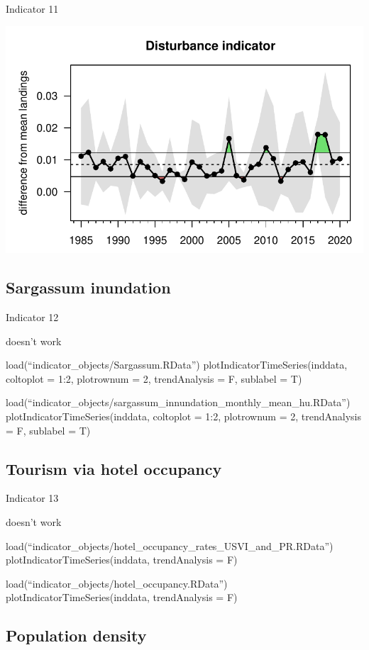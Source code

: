 \documentclass[
  letterpaper,
  oneside,
  open=any]{scrbook}
\begin{document}
Indicator 11

\includegraphics{Report_book_files/Risk_indicators_files/figure-pdf/unnamed-chunk-7-1.pdf}

\hypertarget{sargassum-inundation}{%
\subsection{Sargassum inundation}\label{sargassum-inundation}}

Indicator 12

doesn't work

load(``indicator\_objects/Sargassum.RData'')
plotIndicatorTimeSeries(inddata, coltoplot = 1:2, plotrownum = 2,
trendAnalysis = F, sublabel = T)

load(``indicator\_objects/sargassum\_innundation\_monthly\_mean\_hu.RData'')
plotIndicatorTimeSeries(inddata, coltoplot = 1:2, plotrownum = 2,
trendAnalysis = F, sublabel = T)

\hypertarget{tourism-via-hotel-occupancy}{%
\subsection{Tourism via hotel
occupancy}\label{tourism-via-hotel-occupancy}}

Indicator 13

doesn't work

load(``indicator\_objects/hotel\_occupancy\_rates\_USVI\_and\_PR.RData'')
plotIndicatorTimeSeries(inddata, trendAnalysis = F)

load(``indicator\_objects/hotel\_occupancy.RData'')
plotIndicatorTimeSeries(inddata, trendAnalysis = F)

\hypertarget{population-density}{%
\subsection{Population density}\label{population-density}}
\end{document}
